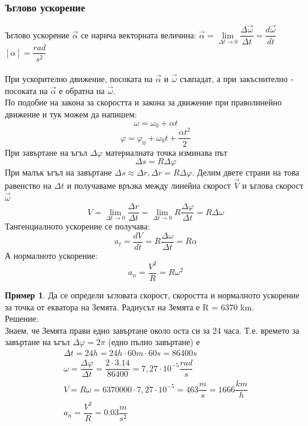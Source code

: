 \documentclass[fleqn, 12pt]{article}
\theoremstyle{definition}
\newtheorem{example}{Пример}[subsection]
\begin{document}
\subsubsection{Ъглово ускорение}
Ъглово ускорение $\vec{\alpha}$ се нарича векторната величина: $\vec{\alpha} = \lim\limits_{\Delta t \rightarrow 0} \dfrac{\Delta \vec{\omega}}{\Delta t} = \dfrac{d \vec{\omega}}{dt} $ \\
$\left[ \alpha \right] = \dfrac{rad}{s^2}$\\
\\
При ускорително движение, посоката на $\vec{\alpha}$ и $\vec{\omega}$ съвпадат, а при закъснително - посоката на $\vec{\alpha}$ е обратна на $\vec{\omega}$. \\
По подобие на закона за скоростта и закона за движение при праволинейно движение и тук можем да напишем:
$$\omega = \omega_0 + \alpha t$$
$$\varphi = \varphi_0 + \omega_0t + \dfrac{\alpha t^2}{2}$$
При завъртане на ъгъл $\Delta \varphi$ материалната точка изминава път
$$\Delta s = R\Delta \varphi$$
При малък ъгъл на завъртане $\Delta s \approx \Delta r, \Delta r =  R\Delta \varphi$.  Делим двете страни на това равенство на $\Delta t$ и получаваме връзка между линейна скорост $\vec{V}$ и ъглова скорост $\vec{\omega}$
$$V = \lim\limits_{\Delta t \rightarrow 0} \dfrac{\Delta r}{\Delta t} = \lim\limits_{\Delta t \rightarrow 0} R \dfrac{\Delta \varphi}{\Delta t} = R \Delta \omega$$
Тангенциалното ускорение се получава: 
$$a_t = \dfrac{dV}{dt} = R \dfrac{\Delta \omega}{\Delta t} = R \alpha$$
А нормалното ускорение: 
$$a_n = \dfrac{V^2}{R} = R \omega^2$$

\begin{example}
Да се определи ъгловата скорост, скоростта и нормалното ускорение за точка от екватора на Земята. Радиусът на Земята е R = 6370 km.\\
Решение: \\
Знаем, че Земята прави едно завъртане около оста си за 24 часа. Т.е. времето за завъртане на ъгъл $\Delta \varphi = 2 \pi$ (едно пълно завъртане) е 
\begin{gather*}
\Delta t = 24h = 24h \cdot 60m \cdot 60s = 86400 s\\
\omega =  \dfrac{\Delta \varphi}{\Delta t} =  \dfrac{2 \cdot 3.14}{86400} = 7,27 \cdot 10^{-5} \dfrac{rad}{s}\\
V = R\omega = 6370000 \cdot  7,27 \cdot 10^{-5} = 463 \dfrac{m}{s} = 1666 \dfrac{km}{h} \\
a_n = \dfrac{V^2}{R} = 0.03 \dfrac{m}{s^2}
\end{gather*}
\end{example}
\end{document}
